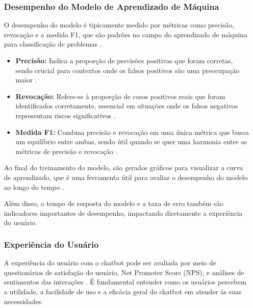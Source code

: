 \documentclass[conference]{IEEEtran}
\begin{document}
\subsubsection{Desempenho do Modelo de Aprendizado de Máquina}
O desempenho do modelo é tipicamente medido por métricas como precisão, revocação e a medida F1, 
que são padrões no campo do aprendizado de máquina para classificação de problemas \cite{Sokolova2009}.

\begin{itemize}
\item \textbf{Precisão:} Indica a proporção de previsões positivas que foram corretas, 
sendo crucial para contextos onde os falsos positivos são uma preocupação maior \cite{Davis2006}.
\item \textbf{Revocação:} Refere-se à proporção de casos positivos reais que foram identificados corretamente, 
essencial em situações onde os falsos negativos representam riscos significativos \cite{Manning1999}.
\item \textbf{Medida F1:} Combina precisão e revocação em uma única métrica que busca um equilíbrio entre ambas, 
sendo útil quando se quer uma harmonia entre as métricas de precisão e revocação \cite{VanRijsbergen1979}.
\end{itemize}

Ao final do treinamento do modelo, são gerados gráficos para visualizar a curva de aprendizado,
que é uma ferramenta útil para avaliar o desempenho do modelo ao longo do tempo \cite{Bengio2012}.

Além disso, o tempo de resposta do modelo e a taxa de erro também são indicadores importantes de desempenho, 
impactando diretamente a experiência do usuário.

\subsubsection{Experiência do Usuário}
A experiência do usuário com o chatbot pode ser avaliada por meio de questionários de satisfação do usuário, 
Net Promoter Score (NPS), e análises de sentimentos das interações \cite{Reichheld2003}. 
É fundamental entender como os usuários percebem a utilidade, 
a facilidade de uso e a eficácia geral do chatbot em atender às suas necessidades.


\end{document}
